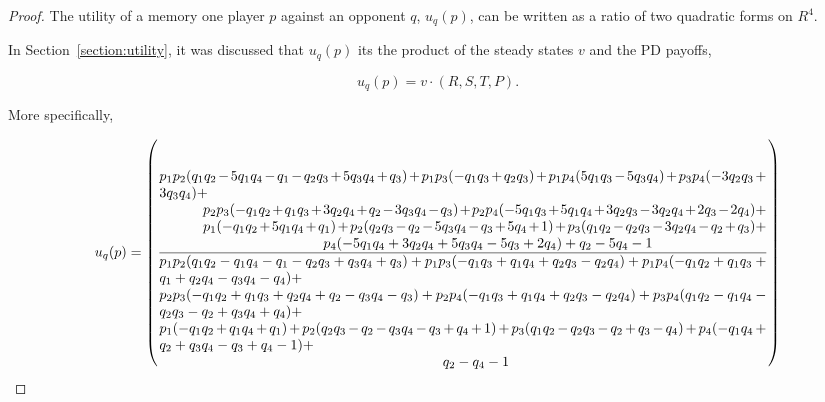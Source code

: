 \begin{proof} The utility of a memory one player \(p\) against an opponent \(q\),
\(u_q(p)\), can be written as a ratio of two quadratic forms on \(R^4\).

In Section~\ref{section:utility}, it was discussed that \(u_q(p)\) its the product
of the steady states \(v\) and the PD payoffs,

\[u_q(p) = v \cdot (R, S, T, P).\]

More specifically,

\begingroup
\footnotesize
\begin{equation}
    u_q(p) =
    \left(
      \frac
        {\parbox{6in}{$
            p_{1} p_{2} (q_{1} q_{2} - 5 q_{1} q_{4} - q_{1} - q_{2} q_{3} + 5 q_{3} q_{4} + q_{3}) + p_{1} p_{3} (- q_{1} q_{3} + q_{2} q_{3}) + p_{1} p_{4} (5 q_{1} q_{3} - 5 q_{3} q_{4}) + p_{3} p_{4} (- 3 q_{2} q_{3} + 3 q_{3} q_{4}) +$ \\
            \hspace*{1cm} $ p_{2} p_{3} (- q_{1} q_{2} + q_{1} q_{3} + 3 q_{2} q_{4} + q_{2} - 3 q_{3} q_{4} - q_{3}) + p_{2} p_{4} (- 5 q_{1} q_{3} + 5 q_{1} q_{4} + 3 q_{2} q_{3} - 3 q_{2} q_{4} + 2 q_{3} - 2 q_{4}) + $ \\
            \hspace*{1cm} $ p_{1} (- q_{1} q_{2} + 5 q_{1} q_{4} + q_{1}) + p_{2} (q_{2} q_{3} - q_{2} - 5 q_{3} q_{4} - q_{3} + 5 q_{4} + 1) + p_{3} (q_{1} q_{2} - q_{2} q_{3} - 3 q_{2} q_{4} - q_{2} + q_{3}) +$ \\
            \hspace*{4cm} $ p_{4} (- 5 q_{1} q_{4} + 3 q_{2} q_{4} + 5 q_{3} q_{4} - 5 q_{3} + 2 q_{4}) + q_{2} - 5 q_{4} - 1$
        }}
        {\parbox{6in}{$
        p_{1} p_{2} (q_{1} q_{2} - q_{1} q_{4} - q_{1} - q_{2} q_{3} + q_{3} q_{4} + q_{3}) + p_{1} p_{3} (- q_{1} q_{3} + q_{1} q_{4} + q_{2} q_{3} - q_{2} q_{4}) + p_{1} p_{4} (- q_{1} q_{2} + q_{1} q_{3} + q_{1} + q_{2} q_{4} - q_{3} q_{4} - q_{4}) +$ \\
        $ p_{2} p_{3} (- q_{1} q_{2} + q_{1} q_{3} + q_{2} q_{4} + q_{2} - q_{3} q_{4} - q_{3}) + p_{2} p_{4} (- q_{1} q_{3} + q_{1} q_{4} + q_{2} q_{3} - q_{2} q_{4}) + p_{3} p_{4} (q_{1} q_{2} - q_{1} q_{4} - q_{2} q_{3} - q_{2} + q_{3} q_{4} + q_{4}) + $ \\
        $ p_{1} (- q_{1} q_{2} + q_{1} q_{4} + q_{1}) + p_{2} (q_{2} q_{3} - q_{2} - q_{3} q_{4} - q_{3} + q_{4} + 1) + p_{3} (q_{1} q_{2} - q_{2} q_{3} - q_{2} + q_{3} - q_{4}) + p_{4} (- q_{1} q_{4} + q_{2} + q_{3} q_{4} - q_{3} + q_{4} - 1) + $ \\
        \hspace*{7cm} $q_{2} - q_{4} - 1$
      }}
    \right)
\end{equation}
\endgroup


\end{proof}
